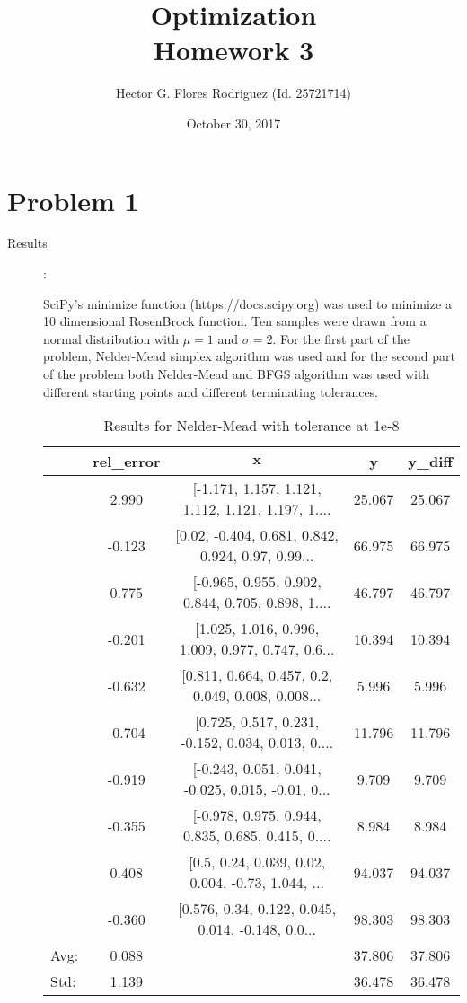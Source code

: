 \documentclass[10pt,onside]{article}
\title{\blue Optimization \\
\blueb Homework 3}
\author{Hector G. Flores Rodriguez (Id. 25721714)}
\date{October 30, 2017} %
\begin{document}
\maketitle

\section{Problem 1}
\begin{description}
\item[Results]:

SciPy's minimize function (https://docs.scipy.org) was used to minimize a 10 dimensional RosenBrock function. Ten samples were drawn from a normal distribution with $\mu=1$ and $\sigma=2$. For the first part of the problem, Nelder-Mead simplex algorithm was used and for the second part of the problem both Nelder-Mead and BFGS algorithm was used with different starting points and different terminating tolerances.

\begin{table}[ht]
\centering
\caption{Results for Nelder-Mead with tolerance at 1e-8}
\begin{tabular}{lcccc}
\toprule
{} &  rel\_error &  $\mathbf{x}$ &       y &  y\_diff \\
\midrule
&      2.990 &  [-1.171, 1.157, 1.121, 1.112, 1.121, 1.197, 1.... &  25.067 &  25.067 \\
&     -0.123 &  [0.02, -0.404, 0.681, 0.842, 0.924, 0.97, 0.99... &  66.975 &  66.975 \\
&      0.775 &  [-0.965, 0.955, 0.902, 0.844, 0.705, 0.898, 1.... &  46.797 &  46.797 \\
&     -0.201 &  [1.025, 1.016, 0.996, 1.009, 0.977, 0.747, 0.6... &  10.394 &  10.394 \\
&     -0.632 &  [0.811, 0.664, 0.457, 0.2, 0.049, 0.008, 0.008... &   5.996 &   5.996 \\
&     -0.704 &  [0.725, 0.517, 0.231, -0.152, 0.034, 0.013, 0.... &  11.796 &  11.796 \\
&     -0.919 &  [-0.243, 0.051, 0.041, -0.025, 0.015, -0.01, 0... &   9.709 &   9.709 \\
&     -0.355 &  [-0.978, 0.975, 0.944, 0.835, 0.685, 0.415, 0.... &   8.984 &   8.984 \\
&      0.408 &  [0.5, 0.24, 0.039, 0.02, 0.004, -0.73, 1.044, ... &  94.037 &  94.037 \\
&     -0.360 &  [0.576, 0.34, 0.122, 0.045, 0.014, -0.148, 0.0... &  98.303 &  98.303 \\
\bottomrule
Avg: & 0.088 &  & 37.806 & 37.806 \\
Std: & 1.139 &  & 36.478 & 36.478 \\
\bottomrule
\end{tabular}
\end{table}


\end{description}
\end{document}
